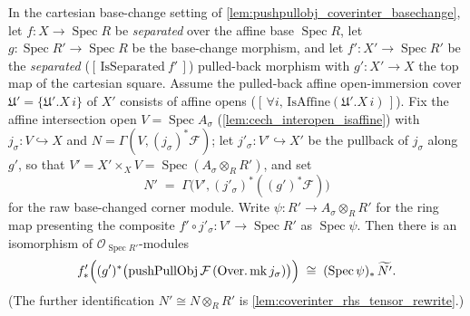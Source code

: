 \begin{lemma}

  \label{lem:coverinter_rhs_iso_tilde}
  In the cartesian base-change setting of \cref{lem:pushpullobj_coverinter_basechange}, let
  \(f : X \to \operatorname{Spec} R\) be \emph{separated} over the affine base
  \(\operatorname{Spec} R\), let \(g : \operatorname{Spec} R' \to \operatorname{Spec} R\) be the
  base-change morphism, and let \(f' : X' \to \operatorname{Spec} R'\) be the \emph{separated}
  (\([\,\mathrm{IsSeparated}\ f'\,]\)) pulled-back morphism with \(g' : X' \to X\) the top map of
  the cartesian square. Assume the pulled-back affine open-immersion cover
  \(\mathfrak{U}' = \{\mathfrak{U}'.X\, i\}\) of \(X'\) consists of affine opens
  (\([\,\forall i,\,\mathrm{IsAffine}(\mathfrak{U}'.X\,i)\,]\)). Fix the affine intersection
  open \(V = \operatorname{Spec} A_\sigma\) (\cref{lem:cech_interopen_isaffine}) with
  \(j_\sigma : V \hookrightarrow X\) and \(N = \Gamma(V, (j_\sigma)^*\mathcal{F})\); let
  \(j'_\sigma : V' \hookrightarrow X'\) be the pullback of \(j_\sigma\) along \(g'\), so that
  \(V' = X' \times_X V = \operatorname{Spec}(A_\sigma \otimes_R R')\), and set
  \[
    N' \;=\; \Gamma\bigl(V', (j'_\sigma)^*((g')^*\mathcal{F})\bigr)
  \]
  for the raw base-changed corner module. Write \(\psi : R' \to A_\sigma \otimes_R R'\) for the
  ring map presenting the composite \(f' \circ j'_\sigma : V' \to \operatorname{Spec} R'\) as
  \(\operatorname{Spec}\psi\). Then there is an isomorphism of
  \(\mathcal{O}_{\operatorname{Spec} R'}\)-modules
  \[
    f'_*\Bigl((g')^*\bigl(\operatorname{pushPullObj}\mathcal{F}\,
      (\operatorname{Over.mk} j_\sigma)\bigr)\Bigr)
      \;\cong\; (\operatorname{Spec}\psi)_*\,\widetilde{N'}.
  \]
  (The further identification \(N' \cong N \otimes_R R'\) is
  \cref{lem:coverinter_rhs_tensor_rewrite}.)
\end{lemma}
